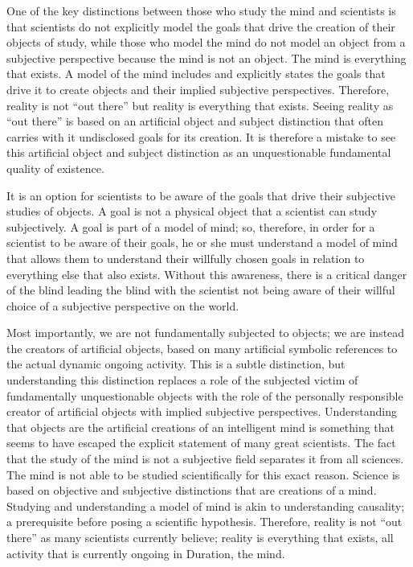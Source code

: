 One of the key distinctions between those who study the mind and
scientists is that scientists do not explicitly model the goals that
drive the creation of their objects of study, while those who model
the mind do not model an object from a subjective perspective because
the mind is not an object.  The mind is everything that exists.  A
model of the mind includes and explicitly states the goals that drive
it to create objects and their implied subjective perspectives.
Therefore, reality is not ``out there'' but reality is everything that
exists.  Seeing reality as ``out there'' is based on an artificial
object and subject distinction that often carries with it undisclosed
goals for its creation.  It is therefore a mistake to see this
artificial object and subject distinction as an unquestionable
fundamental quality of existence.

It is an option for scientists to be aware of the goals that drive
their subjective studies of objects.  A goal is not a physical object
that a scientist can study subjectively.  A goal is part of a model of
mind; so, therefore, in order for a scientist to be aware of their
goals, he or she must understand a model of mind that allows them to
understand their willfully chosen goals in relation to everything else
that also exists.  Without this awareness, there is a critical danger
of the blind leading the blind with the scientist not being aware of
their willful choice of a subjective perspective on the world.

  Most
importantly, we are not fundamentally subjected to objects; we are
instead the creators of artificial objects, based on many artificial
symbolic references to the actual dynamic ongoing activity.  This is a
subtle distinction, but understanding this distinction replaces a role
of the subjected victim of fundamentally unquestionable objects with
the role of the personally responsible creator of artificial objects
with implied subjective perspectives.  Understanding that objects are
the artificial creations of an intelligent mind is something that
seems to have escaped the explicit statement of many great scientists.
The fact that the study of the mind is not a subjective field
separates it from all sciences.  The mind is not able to be studied
scientifically for this exact reason.  Science is based on objective
and subjective distinctions that are creations of a mind.  Studying
and understanding a model of mind is akin to understanding causality;
a prerequisite before posing a scientific hypothesis.  Therefore,
reality is not ``out there'' as many scientists currently believe;
reality is everything that exists, all activity that is currently
ongoing in Duration, the mind.

